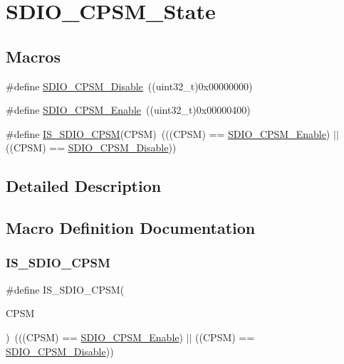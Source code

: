 \hypertarget{group___s_d_i_o___c_p_s_m___state}{}\section{S\+D\+I\+O\+\_\+\+C\+P\+S\+M\+\_\+\+State}
\label{group___s_d_i_o___c_p_s_m___state}
\subsection*{Macros}
\begin{DoxyCompactItemize}
\item 
\#define \mbox{\hyperlink{group___s_d_i_o___c_p_s_m___state_ga996751273ad238e255a740f7c2844c6c}{S\+D\+I\+O\+\_\+\+C\+P\+S\+M\+\_\+\+Disable}}~((uint32\+\_\+t)0x00000000)
\item 
\#define \mbox{\hyperlink{group___s_d_i_o___c_p_s_m___state_gad437cefe89d6175aa074a1c40b909ebc}{S\+D\+I\+O\+\_\+\+C\+P\+S\+M\+\_\+\+Enable}}~((uint32\+\_\+t)0x00000400)
\item 
\#define \mbox{\hyperlink{group___s_d_i_o___c_p_s_m___state_ga58cf04903dab015106e4e0937bef443b}{I\+S\+\_\+\+S\+D\+I\+O\+\_\+\+C\+P\+SM}}(C\+P\+SM)~(((C\+P\+SM) == \mbox{\hyperlink{group___s_d_i_o___c_p_s_m___state_gad437cefe89d6175aa074a1c40b909ebc}{S\+D\+I\+O\+\_\+\+C\+P\+S\+M\+\_\+\+Enable}}) $\vert$$\vert$ ((C\+P\+SM) == \mbox{\hyperlink{group___s_d_i_o___c_p_s_m___state_ga996751273ad238e255a740f7c2844c6c}{S\+D\+I\+O\+\_\+\+C\+P\+S\+M\+\_\+\+Disable}}))
\end{DoxyCompactItemize}


\subsection{Detailed Description}


\subsection{Macro Definition Documentation}
\mbox{\label{group___s_d_i_o___c_p_s_m___state_ga58cf04903dab015106e4e0937bef443b}} 
\subsubsection{\texorpdfstring{IS\_SDIO\_CPSM}{IS\_SDIO\_CPSM}}
{\footnotesize\ttfamily \#define I\+S\+\_\+\+S\+D\+I\+O\+\_\+\+C\+P\+SM(\begin{DoxyParamCaption}\item[{}]{C\+P\+SM }\end{DoxyParamCaption})~(((C\+P\+SM) == \mbox{\hyperlink{group___s_d_i_o___c_p_s_m___state_gad437cefe89d6175aa074a1c40b909ebc}{S\+D\+I\+O\+\_\+\+C\+P\+S\+M\+\_\+\+Enable}}) $\vert$$\vert$ ((C\+P\+SM) == \mbox{\hyperlink{group___s_d_i_o___c_p_s_m___state_ga996751273ad238e255a740f7c2844c6c}{S\+D\+I\+O\+\_\+\+C\+P\+S\+M\+\_\+\+Disable}}))}

